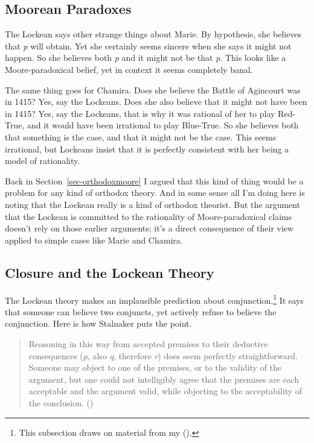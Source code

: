 \documentclass[
  10pt,
  letterpaper,
  twoside]{scrbook}
\begin{document}
\subsection{Moorean Paradoxes}\label{sec-lockemoore}

The Lockean says other strange things about Marie. By hypothesis, she
believes that \emph{p} will obtain. Yet she certainly seems sincere when
she says it might not happen. So she believes both \emph{p} and it might
not be that \emph{p}. This looks like a Moore-paradoxical belief, yet in
context it seems completely banal.

The same thing goes for Chamira. Does she believe the Battle of
Agincourt was in 1415? Yes, say the Lockeans. Does she also believe that
it might not have been in 1415? Yes, say the Lockeans, that is why it
was rational of her to play Red-True, and it would have been irrational
to play Blue-True. So she believes both that something is the case, and
that it might not be the case. This seems irrational, but Lockeans
insist that it is perfectly consistent with her being a model of
rationality.

Back in Section~\ref{sec-orthodoxmoore} I argued that this kind of thing
would be a problem for any kind of orthodox theory. And in some sense
all I'm doing here is noting that the Lockean really is a kind of
orthodox theorist. But the argument that the Lockean is committed to the
rationality of Moore-paradoxical claims doesn't rely on those earlier
arguments; it's a direct consequence of their view applied to simple
cases like Marie and Chamira.

\subsection{Closure and the Lockean Theory}\label{sec-closure}

The Lockean theory makes an implausible prediction about
conjunction.\footnote{This subsection draws on material from my
  ().} It says that someone can
believe two conjuncts, yet actively refuse to believe the conjunction.
Here is how Stalnaker puts the point.

\begin{quote}
Reasoning in this way from accepted premises to their deductive
consequences (\emph{p}, also \emph{q}, therefore \emph{r}) does seem
perfectly straightforward. Someone may object to one of the premises, or
to the validity of the argument, but one could not intelligibly agree
that the premises are each acceptable and the argument valid, while
objecting to the acceptability of the conclusion.
()
\end{quote}
\end{document}
